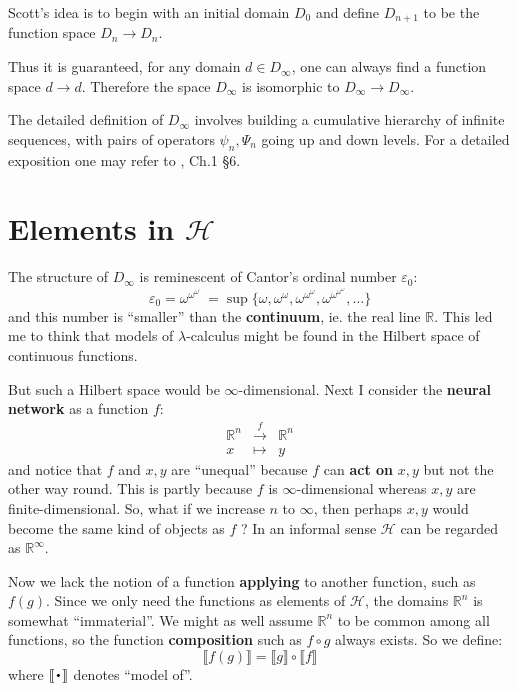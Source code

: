 Scott's idea is to begin with an initial domain $D_0$ and define $D_{n+1}$ to be the function space $D_n \rightarrow D_n$.

Thus it is guaranteed, for any domain $d \in D_{\infty}$, one can always find a function space $d \rightarrow d$.  Therefore the space $D_{\infty}$ is isomorphic to $ D_{\infty} \rightarrow D_{\infty}$.

The detailed definition of $D_{\infty}$ involves building a cumulative hierarchy of infinite sequences, with pairs of operators $\psi_n, \Psi_n$ going up and down levels.  For a detailed exposition one may refer to \parencite{Stenlund1972}, Ch.1 \S6.

\section{Elements in $\mathcal{H}$}

The structure of $D_{\infty}$ is reminescent of Cantor's ordinal number $\varepsilon_0$:
\begin{equation}
{\displaystyle \varepsilon _{0}=\omega ^{\omega ^{\omega ^{\cdot ^{\cdot ^{\cdot }}}}}=\sup\{\omega ,\omega ^{\omega },\omega ^{\omega ^{\omega }},\omega ^{\omega ^{\omega ^{\omega }}},\dots \}}
\end{equation}
and this number is ``smaller'' than the \textbf{continuum}, ie. the real line $\mathbb{R}$.  This led me to think that models of $\lambda$-calculus might be found in the Hilbert space of continuous functions.

But such a Hilbert space would be $\infty$-dimensional.  Next I consider the \textbf{neural network} as a function $f$:
\begin{eqnarray}
\mathbb{R}^n & \stackrel{f}{\longrightarrow} & \mathbb{R}^n \\
x & \mapsto & y \nonumber
\end{eqnarray}
and notice that $f$ and $x, y$ are ``unequal'' because $f$ can \textbf{act on} $x, y$ but not the other way round.  This is partly because $f$ is $\infty$-dimensional whereas $x, y$ are finite-dimensional.  So, what if we increase $n$ to $\infty$, then perhaps $x, y$ would become the same kind of objects as $f$ ?  In an informal sense $\mathcal{H}$ can be regarded as $\mathbb{R}^{\infty}$.

Now we lack the notion of a function \textbf{applying} to another function, such as $f(g)$.  Since we only need the functions as elements of $\mathcal{H}$, the domains $\mathbb{R}^n$ is somewhat ``immaterial''.  We might as well assume $\mathbb{R}^n$ to be common among all functions, so the function \textbf{composition} such as $f \circ g$ always exists.  So we define:
\begin{equation}
\llbracket f(g) \rrbracket = \llbracket g \rrbracket \circ \llbracket f \rrbracket
\end{equation}
where $\llbracket \Cdot \rrbracket$ denotes ``model of''.


